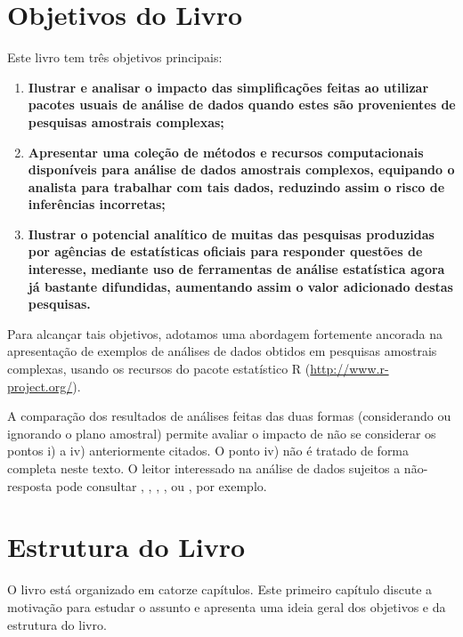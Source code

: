 \documentclass[
]{book}
\begin{document}
\hypertarget{objetivos-do-livro}{%
\section{Objetivos do Livro}\label{objetivos-do-livro}}

Este livro tem três objetivos principais:

\begin{enumerate}
\def\labelenumi{\arabic{enumi})}
\item
  \textbf{Ilustrar e analisar o impacto das simplificações feitas ao utilizar pacotes
  usuais de análise de dados quando estes são provenientes de pesquisas amostrais
  complexas;}
\item
  \textbf{Apresentar uma coleção de métodos e recursos computacionais disponíveis para
  análise de dados amostrais complexos, equipando o analista para trabalhar com
  tais dados, reduzindo assim o risco de inferências incorretas;}
\item
  \textbf{Ilustrar o potencial analítico de muitas das pesquisas produzidas por agências
  de estatísticas oficiais para responder questões de interesse, mediante uso de
  ferramentas de análise estatística agora já bastante difundidas, aumentando assim
  o valor adicionado destas pesquisas.}
\end{enumerate}

Para alcançar tais objetivos, adotamos uma abordagem fortemente ancorada na
apresentação de exemplos de análises de dados obtidos em pesquisas amostrais complexas,
usando os recursos do pacote estatístico R (\url{http://www.r-project.org/}).

A comparação dos resultados de análises feitas das duas formas (considerando ou
ignorando o plano amostral) permite avaliar o impacto de não se considerar os pontos i)
a iv) anteriormente citados. O ponto iv) não é tratado de forma completa neste texto.
O leitor interessado na análise de dados sujeitos a não-resposta pode consultar
\citep{kalton83a}, \citep{LR2002}, \citep{Rubin87}, \citep{SSW92}, ou \citep{Schafer1997}, por exemplo.

\hypertarget{estrutura-do-livro}{%
\section{Estrutura do Livro}\label{estrutura-do-livro}}

O livro está organizado em catorze capítulos. Este primeiro capítulo
discute a motivação para estudar o assunto e apresenta uma ideia
geral dos objetivos e da estrutura do livro.
\end{document}
